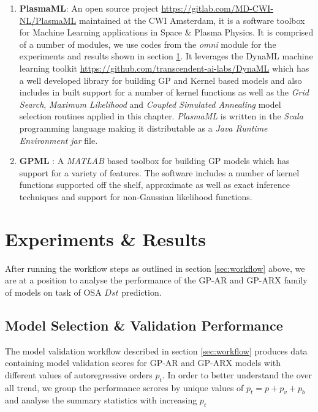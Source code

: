 \documentclass{article}
\begin{document}
\begin{enumerate}

\item \textbf{PlasmaML}: An open source project \url{https://gitlab.com/MD-CWI-NL/PlasmaML} maintained at the CWI Amsterdam, it is a software toolbox for Machine Learning applications in Space \& Plasma Physics. It is comprised of a number of modules, we use codes from the \textit{omni} module for the experiments and results shown in section \ref{sec:results}. It leverages the DynaML machine learning toolkit \url{https://github.com/transcendent-ai-labs/DynaML} which has a well developed library for building GP and Kernel based models and also includes in built support for a number of kernel functions as well as the \emph{Grid Search}, \emph{Maximum Likelihood} and \emph{Coupled Simulated Annealing} model selection routines applied in this chapter. \textit{PlasmaML} is written in the \textit{Scala} programming language making it distributable as a \emph{Java Runtime Environment} \textit{jar} file.

\item \textbf{GPML} \citep{GPML}: A \emph{MATLAB} based toolbox for building GP models which has support for a variety of features. The software includes a number of kernel functions supported off the shelf, approximate as well as exact inference techniques and support for non-Gaussian likelihood functions. 
\end{enumerate}

\section{Experiments \& Results}\label{sec:results}

After running the workflow steps as outlined in section
\ref{sec:workflow} above, we are at a position to analyse the
performance of the GP-AR and GP-ARX family of models on task of OSA
$Dst$ prediction.

\subsection*{Model Selection \& Validation Performance}

The model validation workflow described in section \ref{sec:workflow}
produces data containing model validation scores for GP-AR and GP-ARX
models with different values of autoregressive orders $p_t$. In order
to better understand the over all trend, we group the performance
scrores by unique values of $p_t = p + p_v + p_b$ and analyse the
summary statistics with increasing $p_t$
\end{document}
